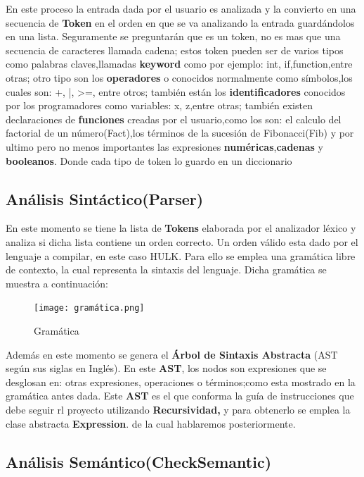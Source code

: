 \documentclass[a4paper,12pt]{article}
\begin{document}
	En este proceso la entrada dada por el usuario es analizada y la convierto en una secuencia de \textbf{Token} en el orden en que se va analizando la entrada guardándolos en una lista. Seguramente se preguntarán que es un token, no es mas que una secuencia de caracteres llamada cadena; estos token pueden ser de varios tipos como palabras claves,llamadas \textbf{keyword} como por ejemplo: int, if,function,entre otras; otro tipo son los \textbf{operadores} o conocidos normalmente como símbolos,los cuales son: +, |, >=, entre otros; también están los \textbf{identificadores} conocidos por los programadores como variables: x, z,entre otras; también existen declaraciones de \textbf{funciones} creadas por el usuario,como los son: el calculo del factorial de un número(Fact),los términos de la sucesión de Fibonacci(Fib) y por ultimo pero no menos importantes las expresiones \textbf{numéricas},\textbf{cadenas} y \textbf{booleanos}. Donde cada tipo de token lo guardo en un diccionario
	
	\subsection{Análisis Sintáctico(Parser)}
	
	En este momento se tiene la lista de \textbf{Tokens} elaborada por el analizador léxico y analiza si dicha lista contiene un orden correcto. Un orden válido esta dado por el lenguaje a compilar, en este caso HULK. Para ello se  emplea una gramática libre de contexto, la cual representa la sintaxis del lenguaje. Dicha gramática se muestra a continuación:\\
	
	\begin{figure}
		\centering
		\texttt{[image: gramática.png]}
		\caption{Gramática}
	\end{figure}
	
	\newpage
	Además en este momento se genera el \textbf{Árbol de Sintaxis Abstracta} (AST según sus siglas en Inglés). En este \textbf{AST}, los nodos son expresiones que se desglosan en: otras expresiones, operaciones o términos;como esta mostrado en la gramática antes dada. Este \textbf{AST} es el que conforma la guía de instrucciones que debe seguir rl proyecto utilizando \textbf{Recursividad,} y para obtenerlo se emplea la clase abstracta \textbf{Expression}. de la cual hablaremos posteriormente.\\
	
	\subsection{Análisis Semántico(CheckSemantic)}
\end{document}
